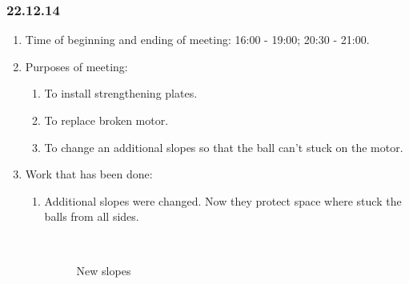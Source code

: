 \subsubsection{22.12.14}
\begin{enumerate}
	
	\item Time of beginning and ending of meeting: 16:00 - 19:00; 20:30 - 21:00.
	
	\item Purposes of meeting: 
	\begin{enumerate}
		
		\item To install strengthening plates.
		
		\item To replace broken motor.
		
		\item To change an additional slopes so that the ball can't stuck on the motor. 
	\end{enumerate}
	
	\item Work that has been done:
	\begin{enumerate}
		
		\item Additional slopes were changed. Now they protect space where stuck the balls from all sides.
        \begin{figure}[H]
        	\begin{minipage}[h]{0.2\linewidth}
        		\center  
        	\end{minipage}
        	\begin{minipage}[h]{0.6\linewidth}
        		\caption{New slopes}
        	\end{minipage}
        \end{figure}		
		

\end{enumerate}
\end{enumerate}
